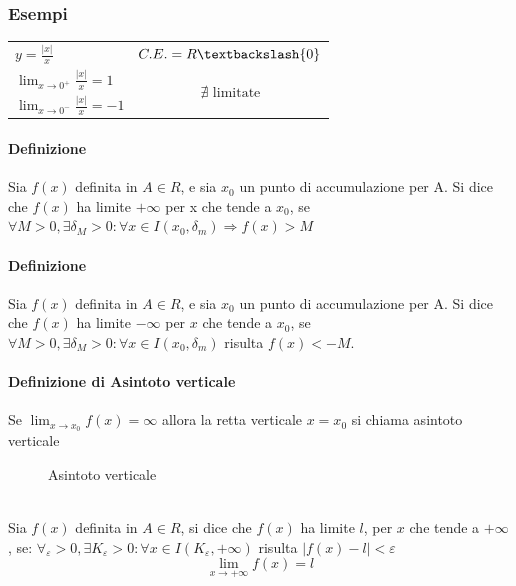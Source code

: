 \subsubsection{Esempi}
\begin{tabular}{lc}
	$y=\frac{|x|}{x}$ & $C.E. = R\textbackslash \{0\}$\\
	$\lim_{x\to 0^+}\frac{|x|}{x}=1$&\multirow{2}{*}{$\nexists \text{ limitate}$} \\
	$\lim_{x\to 0^-}\frac{|x|}{x}=-1$&\\
\end{tabular}
\paragraph{Definizione} Sia $f(x)$ definita in $A \in R$, e sia $x_0$ un punto
di accumulazione per A. Si dice che $f(x)$ ha limite $+\infty$ per x che tende
a $x_0$, se $\forall M>0,\exists \delta_M>0:\forall x \in
I(x_0,\delta_m)\Rightarrow f(x)>M$

\paragraph{Definizione} Sia $f(x)$ definita in $A\in R$, e sia $x_0$ un punto
di accumulazione per A. Si dice che $f(x)$ ha limite $-\infty$ per $x$ che
tende a $x_0$, se $\forall M>0, \exists \delta_M>0:\forall x \in
I(x_0,\delta_m)$
risulta $f(x)<-M$.


\paragraph{Definizione di Asintoto verticale}
Se $\boxed{\lim_{x\to x_0}f(x)=\infty}$ allora la retta verticale $\boxed{x=x_0}$
si chiama asintoto verticale
\begin{figure}[!ht]
	\centering
	\caption{Asintoto verticale}
\end{figure}\\
Sia $f(x)$ definita in $A\in R$, si dice che $f(x)$ ha limite $l$, per $x$ che
tende a $+\infty$, se: $\forall_\varepsilon>0, \exists K_\varepsilon >0:\forall
x \in I (K_\varepsilon, +\infty)$ risulta $|f(x)-l|<\varepsilon$
\begin{equation*}
	\boxed{\lim_{x\to+\infty}f(x)=l}
\end{equation*}
\newpage
